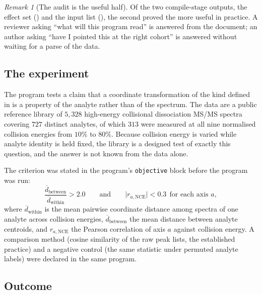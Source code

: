 \documentclass[11pt,twocolumn,a4paper]{article}
\theoremstyle{ssthm}
\theoremstyle{definition}
\theoremstyle{remark}
\newtheorem{remark}[theorem]{Remark}
\newcommand{\shk}[1]{\texttt{#1}}
\begin{document}
\begin{remark}[The audit is the useful half]
\label{rem:audit-useful}
Of the two compile-stage outputs, the effect set
() and the input list
(), the second proved the more useful in
practice. A reviewer asking ``what will this program read'' is answered
from the document; an author asking ``have I pointed this at the right
cohort'' is answered without waiting for a parse of the data.
\end{remark}

\subsection{The experiment}
\label{sec:experiment}

The program tests a claim that a coordinate transformation of the kind
defined in  is a property of the analyte rather
than of the spectrum. The data are a public reference library of
$5{,}328$ high-energy collisional dissociation MS/MS spectra covering
$727$ distinct analytes, of which $313$ were measured at all nine
normalised collision energies from $10\%$ to $80\%$. Because collision
energy is varied while analyte identity is held fixed, the library is a
designed test of exactly this question, and the answer is not known from
the data alone.

The criterion was stated in the program's \shk{objective} block before
the program was run:
\begin{equation}
\frac{\overline{d}_{\text{between}}}{\overline{d}_{\text{within}}} > 2.0
\qquad\text{and}\qquad
\lvert r_{a,\text{NCE}}\rvert < 0.3 \ \ \text{for each axis } a,
\label{eq:criterion}
\end{equation}
where $\overline{d}_{\text{within}}$ is the mean pairwise coordinate
distance among spectra of one analyte across collision energies,
$\overline{d}_{\text{between}}$ the mean distance between analyte
centroids, and $r_{a,\text{NCE}}$ the Pearson correlation of axis $a$
against collision energy. A comparison method (cosine similarity of the
raw peak lists, the established practice) and a negative control (the
same statistic under permuted analyte labels) were declared in the same
program.

\subsection{Outcome}
\end{document}
